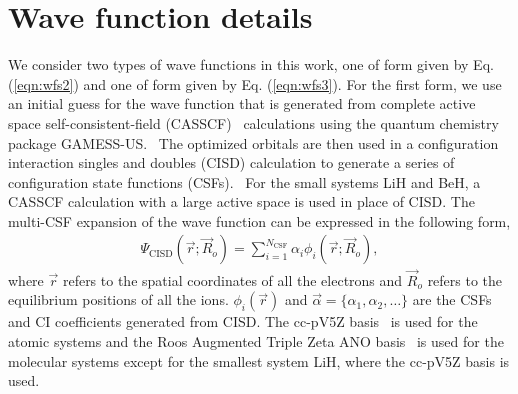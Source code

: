 \documentclass[aip,jcp,numerical,reprint]{revtex4-1}
\begin{document}

\section{ Wave function details}
We consider two types of wave functions in this work, one of form given by Eq.(\ref{eqn:wfs2}) and one of form given by  Eq. (\ref{eqn:wfs3}).  For the first form, we use an initial guess for the wave function that is generated from complete active space self-consistent-field (CASSCF)~\cite{Chaban_MCSCF,Szabo} calculations using the quantum chemistry package GAMESS-US.~\cite{GAMESS} The optimized orbitals are then used in a configuration interaction singles and doubles (CISD) calculation to generate a series of configuration state functions (CSFs).~\cite{Pauncz_CSF} For the small systems LiH and BeH, a CASSCF calculation with a large active space is used in place of CISD. The multi-CSF expansion of the wave function can be expressed in the following form,
\begin{align}
\Psi_{\text{CISD}}(\vec{r};\vec{R}_o)=\sum\limits_{i=1}^{N_{\text{CSF}}}\alpha_i\phi_i(\vec{r};\vec{R}_o), \label{eq:psi_gms}
\end{align}
where $\vec{r}$ refers to the spatial coordinates of all the electrons and $\vec{R}_o$ refers to the equilibrium positions of all the ions. $\phi_i(\vec{r})$ and $\vec{\alpha}=\{\alpha_1,\alpha_2,\dots\}$ are the CSFs and CI coefficients generated from CISD. The cc-pV5Z basis~\cite{dunning} is used for the atomic systems and the Roos Augmented Triple Zeta ANO basis~\cite{roos} is used for the molecular systems except for the smallest system LiH, where the cc-pV5Z basis is used.
\end{document}
